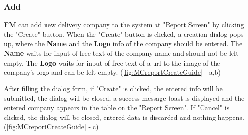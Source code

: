 \subsubsection{Add}

\textbf{FM} can add new delivery company to the system at "Report Screen" by clicking the "Create" button. 
When the "Create" button is clicked, a creation dialog pops up, where the \textbf{Name} and the \textbf{Logo} info of the company should be entered. The \textbf{Name} waits for input of free text of the company name and should not be left empty. The \textbf{Logo} waits for input of free text of a url to the image of the company's logo and can be left empty. (\autoref{fig:MCreportCreateGuide} - a,b)

After filling the dialog form, if "Create" is clicked, the entered info will be submitted, the dialog will be closed, a success message toast is displayed and the entered company appears in the table on the "Report Screen". If "Cancel" is clicked, the dialog will be closed, entered data is discarded and nothing happens. (\autoref{fig:MCreportCreateGuide} - c)

